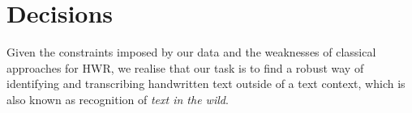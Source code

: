 

\section{Decisions}

	Given the constraints imposed by our data and the weaknesses of classical approaches for HWR, we realise that our task is to find a robust way of identifying and transcribing handwritten text outside of a text context, which is also known as recognition of \emph{text in the wild}.





